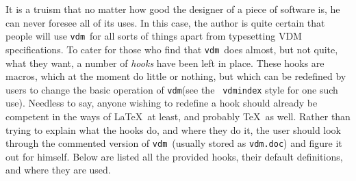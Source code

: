 \documentclass{article}
\newcommand{\Vdm}{{\tt vdm\/}}
\renewcommand{\^}[1]{$\langle${\rm #1\/}$\rangle$}
\begin{document}
It is a truism that no matter how good the designer of a piece of
software is, he can never foresee all of its uses.  In this case, the
author is quite certain that people will use \Vdm\ for all sorts of
things apart from typesetting VDM specifications.  To cater for those
who find that \Vdm\ does almost, but not quite, what they want, a
number of {\em hooks\/} have been left in place.  These hooks are
macros, which at the moment do little or nothing, but which can be
redefined by users to change the basic operation of \Vdm (see the {\tt
vdmindex} style for one such use).  Needless to
say, anyone wishing to redefine a hook should already be competent in
the ways of \LaTeX\ at least, and probably \TeX\ as well.  Rather than
trying to explain what the hooks do, and where they do it, the user
should look through the commented version of \Vdm\ (usually stored as
{\tt vdm.doc}) and figure it out for himself.  Below are listed all
the provided hooks, their default definitions, and where they are used.
\end{document}
